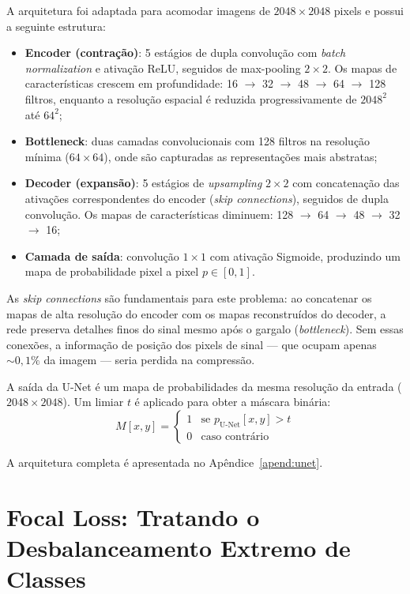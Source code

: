 \documentclass[
       oneside,
       english,
       brazil
       ]{abntbibufjf}
\begin{document}
A arquitetura foi adaptada para acomodar imagens de $2048 \times 2048$ pixels
e possui a seguinte estrutura:
\begin{itemize}
    \item \textbf{Encoder (contração)}: 5 estágios de dupla convolução com
    \textit{batch normalization} e ativação ReLU, seguidos de
    max-pooling $2 \times 2$. Os mapas de características crescem em
    profundidade: 16 $\to$ 32 $\to$ 48 $\to$ 64 $\to$ 128 filtros, enquanto
    a resolução espacial é reduzida progressivamente de $2048^2$ até
    $64^2$;
    \item \textbf{Bottleneck}: duas camadas convolucionais com 128 filtros na
    resolução mínima ($64 \times 64$), onde são capturadas as representações
    mais abstratas;
    \item \textbf{Decoder (expansão)}: 5 estágios de \textit{upsampling}
    $2 \times 2$ com concatenação das ativações correspondentes do encoder
    (\textit{skip connections}), seguidos de dupla convolução. Os mapas de
    características diminuem: 128 $\to$ 64 $\to$ 48 $\to$ 32 $\to$ 16;
    \item \textbf{Camada de saída}: convolução $1 \times 1$ com ativação
    Sigmoide, produzindo um mapa de probabilidade pixel a pixel
    $p \in [0, 1]$.
\end{itemize}

As \textit{skip connections} são fundamentais para este problema: ao
concatenar os mapas de alta resolução do encoder com os mapas reconstruídos do
decoder, a rede preserva detalhes finos do sinal mesmo após o gargalo
(\textit{bottleneck}). Sem essas conexões, a informação de posição dos
pixels de sinal — que ocupam apenas ${\sim}0{,}1\%$ da imagem — seria
perdida na compressão.

A saída da U-Net é um mapa de probabilidades da mesma resolução da entrada
($2048 \times 2048$). Um limiar $t$ é aplicado para obter a máscara binária:
\begin{equation}
    M[x, y] = \begin{cases}
        1 & \text{se } p_{\text{U-Net}}[x, y] > t \\
        0 & \text{caso contrário}
    \end{cases}
    \label{eq:binary_mask}
\end{equation}

A arquitetura completa é apresentada no Apêndice~\ref{apend:unet}.

\section{Focal Loss: Tratando o Desbalanceamento Extremo de Classes}
\label{sec:focal_loss}
\end{document}

